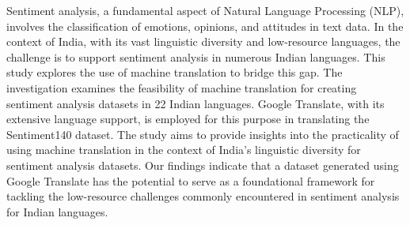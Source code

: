 Sentiment analysis, a fundamental aspect of Natural Language Processing (NLP), involves the classification of emotions, opinions, and attitudes in text data. In the context of India, with its vast linguistic diversity and low-resource languages, the challenge is to support sentiment analysis in numerous Indian languages. This study explores the use of machine translation to bridge this gap. The investigation examines the feasibility of machine translation for creating sentiment analysis datasets in 22 Indian languages. Google Translate, with its extensive language support, is employed for this purpose in translating the Sentiment140 dataset. The study aims to provide insights into the practicality of using machine translation in the context of India's linguistic diversity for sentiment analysis datasets. Our findings indicate that a dataset generated using Google Translate has the potential to serve as a foundational framework for tackling the low-resource challenges commonly encountered in sentiment analysis for Indian languages.